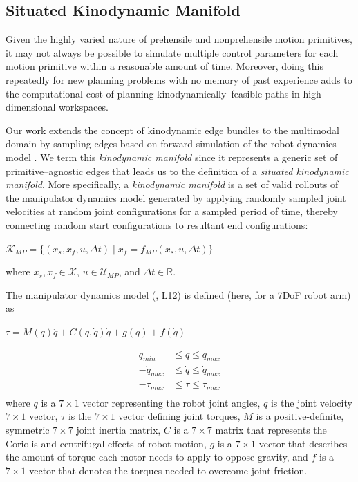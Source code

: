 \subsection{Situated Kinodynamic Manifold}\label{sec:edge-bundles}

Given the highly varied nature of prehensile and nonprehensile motion primitives, it may not always be possible to simulate multiple control parameters for each motion primitive within a reasonable amount of time. Moreover, doing this repeatedly for new planning problems with no memory of past experience adds to the computational cost of planning kinodynamically--feasible paths in high--dimensional workspaces.

Our work extends the concept of kinodynamic edge bundles to the multimodal domain by sampling edges based on forward simulation of the robot dynamics model \cite{shome2021asymptotically}. We term this \textsl{kinodynamic manifold} since it represents a generic set of primitive--agnostic edges that leads us to the definition of a \textsl{situated kinodynamic manifold}. More specifically, a \textsl{kinodynamic manifold} is a set of valid rollouts of the manipulator dynamics model generated by applying randomly sampled joint velocities at random joint configurations for a sampled period of time, thereby connecting random start configurations to resultant end configurations:
\begin{center}
$\mathcal{K}_{MP} = \{(x_s, x_f, u, \Delta t) \mid x_f = f_{MP}(x_s, u, \Delta t)\}$
\end{center}
where $x_s, x_f \in \mathcal{X}$, $u \in \mathcal{U}_{MP}$, and $\Delta t \in \mathbb{R}$.


% 

The manipulator dynamics model (, L12) is defined (here, for a 7DoF robot arm) as 
\begin{center}
$\tau = M(q)\ddot{q} + C(q, \dot{q})\dot{q} + g(q) + f(\dot{q})$
\end{center}
\begin{align*}
q_{min} &\leq q \leq q_{max}\\
-\dot{q}_{max} &\leq \dot{q} \leq \dot{q}_{max}\\
-\tau_{max} &\leq \tau \leq \tau_{max}\\
\end{align*}
where $q$ is a $7\times1$ vector representing the robot joint angles, $\dot{q}$ is the joint velocity $7\times1$ vector, $\tau$ is the $7\times1$ vector defining joint torques, $M$ is a positive-definite, symmetric $7\times7$ joint inertia matrix, $C$ is a $7\times7$ matrix that represents the Coriolis and centrifugal effects of robot motion, $g$ is a $7\times1$ vector that describes the amount of torque each motor needs to apply to oppose gravity, and $f$ is a $7\times1$ vector that denotes the torques needed to overcome joint friction.

